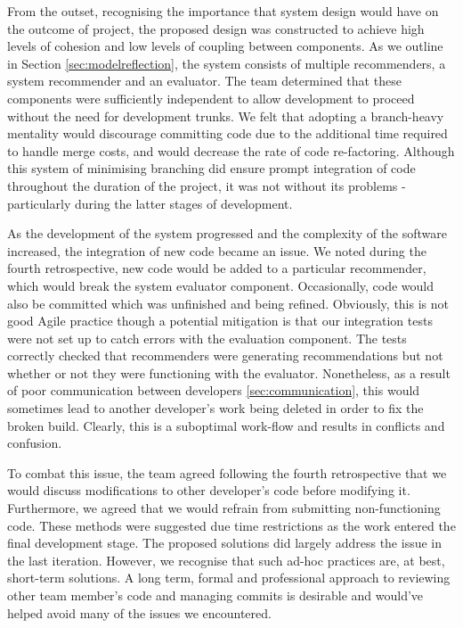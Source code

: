 \documentclass{l3proj}
\begin{document}
From the outset, recognising the importance that system design would have on the outcome of project, the proposed design was constructed to achieve high levels of cohesion and low levels of coupling between components. As we outline in Section \ref{sec:modelreflection}, the system consists of multiple recommenders, a system recommender and an evaluator. The team determined that these components were sufficiently independent to allow development to proceed without the need for development trunks. We felt that adopting a branch-heavy mentality would discourage committing code due to the additional time required to handle merge costs, and would decrease the rate of code re-factoring. Although this system of minimising branching did ensure prompt integration of code throughout the duration of the project, it was not without its problems - particularly during the latter stages of development.

As the development of the system progressed and the complexity of the software increased, the integration of new code became an issue. We noted during the fourth retrospective, new code would be added to a particular recommender, which would break the system evaluator component. Occasionally, code would also be committed which was unfinished and being refined. Obviously, this is not good Agile practice though a potential mitigation is that our integration tests were not set up to catch errors with the evaluation component. The tests correctly checked that recommenders were generating recommendations but not whether or not they were functioning with the evaluator. Nonetheless, as a result of poor communication between developers \ref{sec:communication}, this would sometimes lead to another developer's work being deleted in order to fix the broken build. Clearly, this is a suboptimal work-flow and results in conflicts and confusion. 

To combat this issue, the team agreed following the fourth retrospective that we would discuss modifications to other developer's code before modifying it. Furthermore, we agreed that we would refrain from submitting non-functioning code. These methods were suggested due time restrictions as the work entered the final development stage. The proposed solutions did largely address the issue in the last iteration. However, we recognise that such ad-hoc practices are, at best, short-term solutions. A long term, formal and professional approach to reviewing other team member's code and managing commits is desirable and would've helped avoid many of the issues we encountered.
\end{document}
